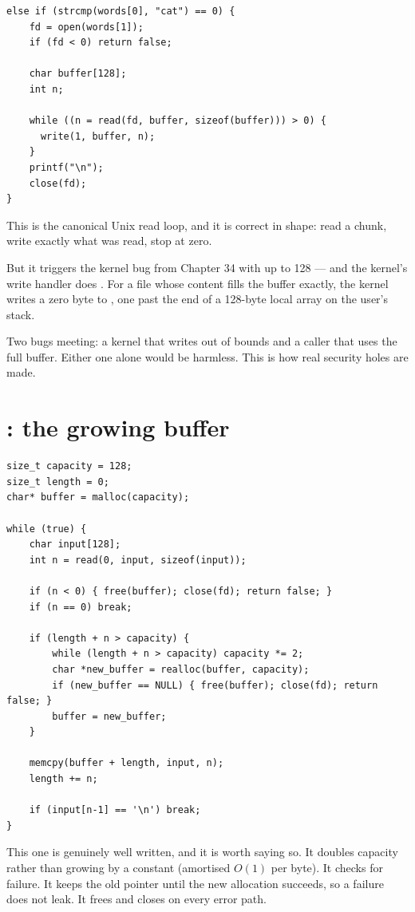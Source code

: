 \begin{lstlisting}[style=c]
else if (strcmp(words[0], "cat") == 0) {
    fd = open(words[1]);
    if (fd < 0) return false;

    char buffer[128];
    int n;

    while ((n = read(fd, buffer, sizeof(buffer))) > 0) {
      write(1, buffer, n);
    }
    printf("\n");
    close(fd);
}
\end{lstlisting}

This is the canonical Unix read loop, and it is correct in shape: read a chunk, write exactly what
was read, stop at zero.

\begin{danger}{But it triggers the kernel bug from Chapter 34}
 with  up to 128 --- and the kernel's write handler does
. For a file whose content fills the buffer
exactly, the kernel writes a zero byte to , one past the end of a 128-byte local
array on the user's stack.

Two bugs meeting: a kernel that writes out of bounds and a caller that uses the full buffer. Either
one alone would be harmless. This is how real security holes are made.
\end{danger}

\section{: the growing buffer}

\begin{lstlisting}[style=c]
size_t capacity = 128;
size_t length = 0;
char* buffer = malloc(capacity);

while (true) {
    char input[128];
    int n = read(0, input, sizeof(input));

    if (n < 0) { free(buffer); close(fd); return false; }
    if (n == 0) break;

    if (length + n > capacity) {
        while (length + n > capacity) capacity *= 2;
        char *new_buffer = realloc(buffer, capacity);
        if (new_buffer == NULL) { free(buffer); close(fd); return false; }
        buffer = new_buffer;
    }

    memcpy(buffer + length, input, n);
    length += n;

    if (input[n-1] == '\n') break;
}
\end{lstlisting}

This one is genuinely well written, and it is worth saying so. It doubles capacity rather than
growing by a constant (amortised $O(1)$ per byte). It checks  for failure. It keeps
the old pointer until the new allocation succeeds, so a failure does not leak. It frees and closes
on every error path.

